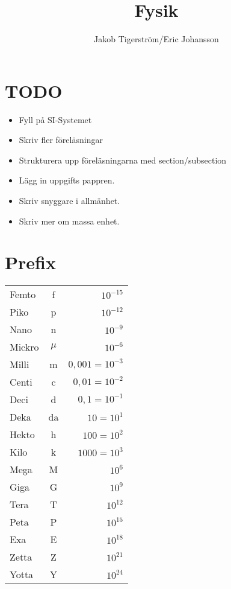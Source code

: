 \documentclass[a4paper,11pt]{article}
\title{Fysik}
\author{Jakob Tigerström/Eric Johansson}
\begin{document}
\maketitle
\tableofcontents
\newpage
\begin{flushleft}
\section{TODO}
\begin{itemize}
  \item Fyll på SI-Systemet
  \item Skriv fler föreläsningar
  \item Strukturera upp föreläsningarna med section/subsection
  \item Lägg in uppgifts pappren.
  \item Skriv snyggare i allmänhet.
  \item Skriv mer om massa enhet.
\end{itemize}
\section{Prefix}

\begin{tabular}{l c r}
  Femto & f & $ 10^{-15} $\\ 
  Piko & p & $ 10^{-12} $\\ 
  Nano & n & $ 10^{-9} $\\ 
  Mickro & $ \mu $ & $ 10^{-6} $\\ 
  Milli & m & $ 0,001 = 10^{-3} $\\
  Centi & c & $ 0,01 = 10^{-2} $\\
  Deci & d & $ 0,1 = 10^{-1}$\\
  Deka & da & $ 10 = 10^1 $\\
  Hekto & h & $ 100 = 10^2 $\\
  Kilo & k & $ 1000 = 10^3 $\\
  Mega & M & $ 10^6 $\\
  Giga & G & $ 10^9 $\\
  Tera & T & $ 10^{12} $\\
  Peta & P & $ 10^{15} $\\
  Exa & E & $ 10^{18} $\\
  Zetta & Z & $ 10^{21} $\\
  Yotta & Y & $ 10^{24} $\\
\end{tabular}
\newpage

\end{flushleft}
\end{document}
